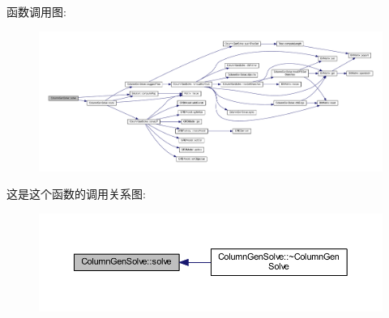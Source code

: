 函数调用图\+:
\nopagebreak
\begin{figure}[H]
\begin{center}
\leavevmode
\includegraphics[width=350pt]{classColumnGenSolve_aad7c316627e7ea6de4138db1a33e66ee_cgraph}
\end{center}
\end{figure}




这是这个函数的调用关系图\+:
\nopagebreak
\begin{figure}[H]
\begin{center}
\leavevmode
\includegraphics[width=350pt]{classColumnGenSolve_aad7c316627e7ea6de4138db1a33e66ee_icgraph}
\end{center}
\end{figure}


